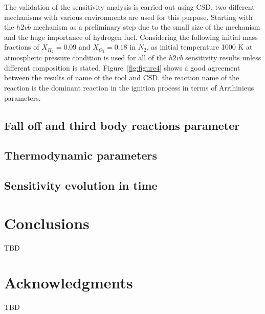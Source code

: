 \documentclass[preprint,review,12pt]{elsarticle}
\begin{document}
%
%
The validation of the sensitivity analysis is carried out using CSD, two different mechanisms with various environments are used for this purpose. Starting with the $h2vb$ mechanism as a preliminary step due to the small size of the mechanism and the huge importance of hydrogen fuel. Considering the following  initial mass fractions of $X_{H_2} = 0.09$ and $X_{O_2} = 0.18$ in $N_2$, as initial temperature 1000 K at atmospheric pressure condition is used for all of the $h2vb$ sensitivity results unless different composition is stated. Figure~\ref{fig:figure4} shows a good agreement between the results of {\color{red} name of the tool} and CSD. the reaction  {\color{red} name of the reaction} is the dominant reaction in the ignition process in terms of Arrihinieus parameters. 
 

\subsection{Fall off and third body reactions parameter}

\subsection{Thermodynamic parameters}

\subsection{Sensitivity evolution in time}


\section{Conclusions}
\label{Conclusions}

TBD

\section*{Acknowledgments}
\label{Acknowledgments}

TBD 



\end{document}
